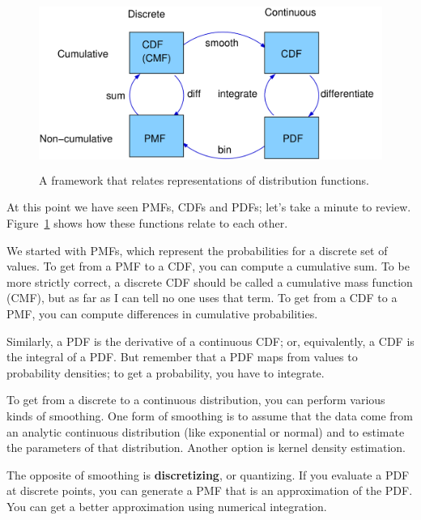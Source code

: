 \documentclass[12pt]{book}
\begin{document}
\begin{figure}
\centerline{\includegraphics[height=2.2in]{figs/distribution_functions.pdf}}
\caption{A framework that relates representations of distribution
functions.}
\label{dist_framework}
\end{figure}

At this point we have seen PMFs, CDFs and PDFs; let's take a minute
to review.  Figure~\ref{dist_framework} shows how these functions relate
to each other.

We started with PMFs, which represent the probabilities for a discrete
set of values.  To get from a PMF to a CDF, you can compute a cumulative
sum.  To be more strictly correct, a discrete CDF should be called a
cumulative mass function (CMF), but as far as I can tell no one uses
that term.  
To get from a CDF to a PMF, you can compute differences in cumulative
probabilities.

Similarly, a PDF is the derivative of a continuous CDF; or, equivalently,
a CDF is the integral of a PDF.  But remember that a PDF maps from
values to probability densities; to get a probability, you have to
integrate.

To get from a discrete to a continuous distribution, you can perform
various kinds of smoothing.  One form of smoothing is to assume that
the data come from an analytic continuous distribution
(like exponential or normal) and to estimate the parameters of that
distribution.  Another option is kernel density estimation.

The opposite of smoothing is {\bf discretizing}, or quantizing.  If you
evaluate a PDF at discrete points, you can generate a PMF that is an
approximation of the PDF.  You can get a better approximation using
numerical integration.  
\end{document}
